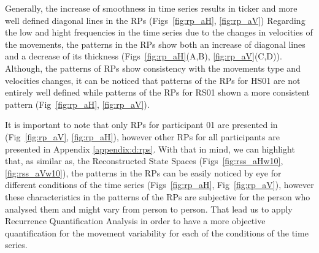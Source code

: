 Generally, the increase of smoothness in time series results in ticker 
and more well defined diagonal lines in the RPs 
(Figs~\ref{fig:rp_aH}, \ref{fig:rp_aV}) 
Regarding the low and hight frequencies in the time series due to the 
changes in velocities of the movements, the patterns in the RPs 
show both an increase of diagonal lines and a decrease of its thickness
(Figs~\ref{fig:rp_aH}(A,B), \ref{fig:rp_aV}(C,D)).
Although, the patterns of RPs show consistency with the movements type 
and velocities changes, it can be noticed that patterns of the RPs for 
HS01 are not entirely well defined while patterns of the RPs for RS01 
shown a more consistent pattern (Fig~\ref{fig:rp_aH}, \ref{fig:rp_aV}). 

It is important to note that only RPs for participant 01 are presented
in (Fig~\ref{fig:rp_aV}, \ref{fig:rp_aH}), however
other RPs for all participants are presented in Appendix \ref{appendix:d:rps}.
With that in mind, we can highlight that, as similar as, the 
Reconstructed State Spaces (Figs~\ref{fig:rss_aHw10}, \ref{fig:rss_aVw10}), 
the patterns in the RPs can be easily noticed by eye for different conditions 
of the time series (Figs~\ref{fig:rp_aH}, Fig~\ref{fig:rp_aV}),
however these characteristics in the patterns of the RPs are subjective 
for the person who analysed them and might vary from person to person. 
That lead us to apply Recurrence Quantification Analysis in order to have 
a more objective quantification for the movement variability for each of 
the conditions of the time series.
